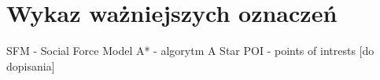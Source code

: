 \chapter{Wykaz ważniejszych oznaczeń}
\label{sec:wykazOznaczen}

SFM - Social Force Model
A* - algorytm A Star
POI - points of intrests
[do dopisania]
















